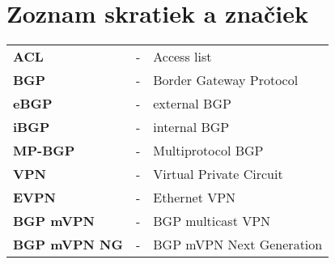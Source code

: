 \chapter*{Zoznam skratiek a značiek}

\begin{longtabu} to \textwidth {X[1.3,l] X[0.2,c] X[5,l]}
    \textbf{ACL} & - & Access list \\
    
    \textbf{BGP} & - & Border Gateway Protocol \\
    \textbf{eBGP} & - & external BGP \\
    \textbf{iBGP} & - & internal BGP \\
    \textbf{MP-BGP} & - & Multiprotocol BGP \\
    
    \textbf{VPN} & - & Virtual Private Circuit \\
    \textbf{EVPN} & - & Ethernet VPN\\
    \textbf{BGP mVPN} & - & BGP multicast VPN \\
    \textbf{BGP mVPN NG} & - & BGP mVPN Next Generation\\
    

\end{longtabu}
